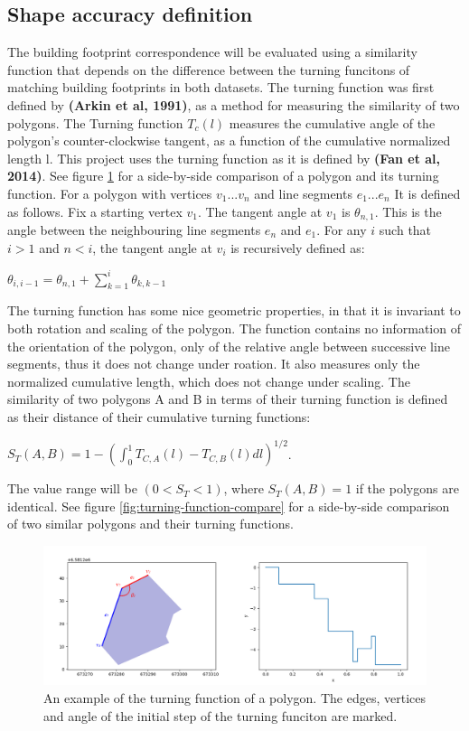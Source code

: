 \documentclass{kththesis}
\begin{document}
\subsection{Shape accuracy definition}

The building footprint correspondence will be evaluated using a similarity function that depends on the difference between the turning funcitons of matching building footprints in both datasets.
The turning function was first defined by \textbf{(Arkin et al, 1991)}, as a method for measuring the similarity of two polygons.
The Turning function $T_c(l)$ measures the cumulative angle of the polygon's counter-clockwise tangent, as a function of the cumulative normalized length l.
This project uses the turning function as it is defined by \textbf{(Fan et al, 2014)}.
See figure \ref{fig:turning-function} for a side-by-side comparison of a polygon and its turning function.
For a polygon with vertices ${v_1 ... v_n}$ and line segments ${e_1 ... e_n}$ It is defined as follows.
Fix a starting vertex $v_1$.
The tangent angle at $v_1$ is $\theta_{n,1}$. This is the angle between the neighbouring line segments $e_n$ and $e_1$.
For any $i$ such that $i>1$ and $n<i$, the tangent angle at $v_i$ is recursively defined as:
\begin{center}
    $\theta_{i, i-1} = \theta_{n,1} + \sum^{i}_{k=1} \theta_{k, k-1}$
\end{center}
The turning function has some nice geometric properties, in that it is invariant to both rotation and scaling of the polygon. The function contains no information of the orientation of the polygon, only of the relative angle between successive line segments, thus it does not change under roation. It also measures only the normalized cumulative length, which does not change under scaling.
The similarity of two polygons A and B in terms of their turning function is defined as their distance of their cumulative turning functions:
\begin{center}
    $S_{T}(A, B) = 1 - (\int^{1}_{0} T_{C,A}(l) - T_{C,B}(l) dl)^{1/2}$.
\end{center}
The value range will be $(0 < S_{T} < 1)$, where $S_{T}(A,B) = 1$ if the polygons are identical. 
See figure \ref{fig:turning-function-compare} for a side-by-side comparison of two similar polygons and their turning functions.

\begin{figure}[H]
    \centering
    \includegraphics[width=\textwidth,height=0.5\textheight,keepaspectratio]{img_turn_function}
    \caption{An example of the turning function of a polygon. The edges, vertices and angle of the initial step of the turning funciton are marked.}
    \label{fig:turning-function}
\end{figure}
\end{document}

